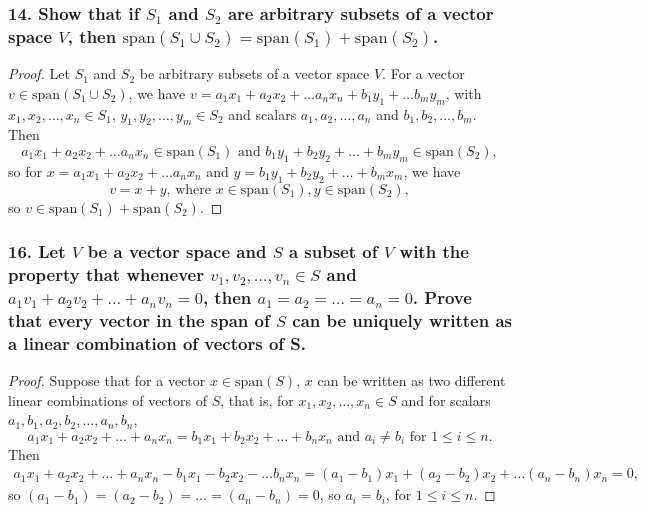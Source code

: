 \documentclass{article}
\begin{document}
\subsubsection*{14. Show that if $S_1$ and $S_2$ are arbitrary subsets of a vector space $V$, then $\text{span}(S_1 \cup S_2) = \text{span}(S_1) + \text{span}(S_2)$.}
\begin{proof}
	Let $S_1$ and $S_2$ be arbitrary subsets of a vector space $V$. For a vector $v \in \text{span}(S_1 \cup S_2)$, we have $v = a_1x_1 + a_2x_2 + \dots a_nx_n + b_1y_1 + \dots b_my_m$, with $x_1, x_2, \dots, x_n \in S_1$, $y_1, y_2, \dots, y_m \in S_2$ and scalars $a_1, a_2, \dots, a_n$ and $b_1, b_2, \dots, b_m$. Then \[a_1x_1 + a_2x_2 + \dots a_nx_n \in \text{span}(S_1)\text{ and }b_1y_1 + b_2y_2 + \dots + b_my_m \in \text{span}(S_2),\] so for $x = a_1x_1 + a_2x_2 + \dots a_nx_n$ and $y = b_1y_1 + b_2y_2 + \dots + b_mx_m$, we have \[ v = x + y\text{, where } x\in \text{span}(S_1), y\in \text{span}(S_2), \] so $v \in \text{span}(S_1) + \text{span}(S_2)$.
\end{proof}

\subsubsection*{16. Let $V$ be a vector space and $S$ a subset of $V$ with the property that whenever $v_1, v_2, \dots, v_n \in S$ and $a_1v_1 + a_2v_2 + \dots + a_nv_n = 0$, then $a_1 = a_2 = \dots = a_n = 0$. Prove that every vector in the span of $S$ can be uniquely written as a linear combination of vectors of S.}
\begin{proof}
	Suppose that for a vector $x \in \text{span}(S)$, $x$ can be written as two different linear combinations of vectors of $S$, that is, for $x_1, x_2, \dots, x_n \in S$ and for scalars $a_1, b_1, a_2, b_2, \dots, a_n, b_n$, \[ a_1x_1 + a_2x_2 + \dots + a_nx_n = b_1x_1 + b_2x_2 + \dots + b_nx_n \text{ and } a_i \ne b_i \text{ for } 1 \le i \le n. \] Then
	\begin{align*}
		a_1x_1 + a_2x_2 + \dots + a_nx_n - b_1x_1 - b_2x_2 - \dots b_nx_n = (a_1 - b_1)x_1 + (a_2 - b_2)x_2 + \dots (a_n - b_n)x_n = 0,
	\end{align*}
	so $(a_1 - b_1) = (a_2 - b_2) = \dots = (a_n - b_n) = 0$, so $a_i = b_i$, for $1 \le i \le n$.
\end{proof}
\end{document}
